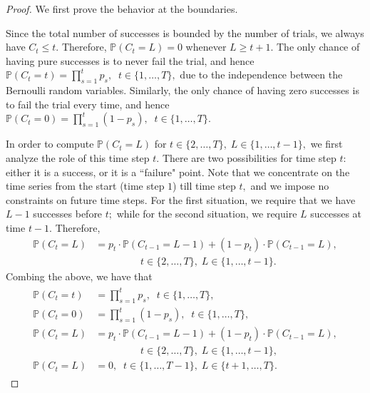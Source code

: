 \documentclass{article}
\theoremstyle{plain}
\theoremstyle{definition}
\theoremstyle{remark}
\begin{document}
\begin{proof}

We first prove the behavior at the boundaries.

Since the total number of successes is bounded by the number of trials, we always have $C_t\leq t.$ Therefore, $\mathbb{P}(C_t=L)=0$ whenever $ L\geq t+1.$ The only chance of having pure successes is to never fail the trial, and hence $\mathbb{P}(C_t=t) =\prod_{s=1}^t p_s, \;\; t\in\{1, \dots, T\},$ due to the independence between the Bernoulli random variables. Similarly, the only chance of having zero successes is to fail the trial every time, and hence $\mathbb{P}(C_t=0) =\prod_{s=1}^t(1-p_s), \;\; t\in\{1, \dots, T\}$.

In order to compute $\mathbb{P}(C_t=L)$ for $t\in\{2, \dots, T\},\;L\in\{1, \dots, t-1\},$ we first analyze the role of this time step $t$. There are two possibilities for time step $t$: either it is a success, or it is a ``failure" point. Note that we concentrate on the time series from the start (time step $1$) till time step $t,$ and we impose no constraints on future time steps. For the first situation, we require that we have $L-1$ successes before $t;$ while for the second situation, we require $L$ successes at time $t-1.$ Therefore, 
\begin{align*}
    \mathbb{P}(C_t=L) &=p_t\cdot\mathbb{P}(C_{t-1}=L-1)+ (1-p_t)\cdot \mathbb{P}(C_{t-1}=L), \\
    & \qquad \qquad \;\;t\in\{2, \dots, T\},\;L\in\{1, \dots, t-1\}.
\end{align*}
Combing the above, we have that 
\begin{align*}
\begin{split}
    \mathbb{P}(C_t=t) &=\prod_{s=1}^t p_s, \;\; t\in\{1, \dots, T\},\\
    \mathbb{P}(C_t=0) &=\prod_{s=1}^t(1-p_s), \;\; t\in\{1, \dots, T\},\\
    \mathbb{P}(C_t=L) &=p_t\cdot\mathbb{P}(C_{t-1}=L-1)+ (1-p_t)\cdot \mathbb{P}(C_{t-1}=L),\\
    & \qquad \qquad  \;\;t\in\{2, \dots, T\},\;L\in\{1, \dots, t-1\},\\
    \mathbb{P}(C_t=L)&=0,\;\;t\in\{1, \dots, T-1\}, \; L\in\{t+1, \dots, T\}.
\end{split}
\end{align*}
\end{proof}
\end{document}
